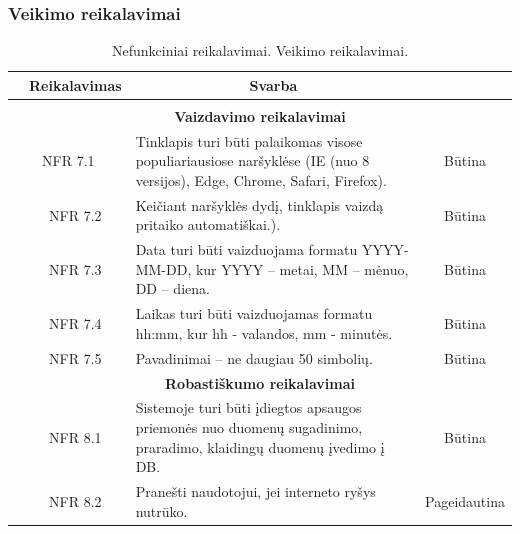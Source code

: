 \documentclass{VUMIFPSkursinis}
\begin{document}
\subsubsection{Veikimo reikalavimai}
\begin{table}[H]
	\caption{Nefunkciniai reikalavimai. Veikimo reikalavimai.}
	\begin{tabular}{|p{1cm}|p{1cm}|p{}|p{}|}
		\hline 
		\rowcolor{gray!50}
		\multicolumn{2}{|c|}{{\bfseries Kodas}}&
		\multicolumn{1}{c|}{{\bfseries Reikalavimas}}&
		\multicolumn{1}{c|}{{\bfseries Svarba}}\\
		\hline
		\rowcolor{lightgray}
		\multicolumn{4}{|c|}{Veikimo reikalavimai}\\		
		
		\hline
		\multicolumn{4}{|c|}{\bfseries Vaizdavimo reikalavimai}\\	
		
		\hline
		\multicolumn{2}{|c|}{NFR 7.1}&
		{Tinklapis turi būti palaikomas visose populiariausiose naršyklėse (IE (nuo 8 versijos), Edge, Chrome, Safari, Firefox).
		}&		
		\multicolumn{1}{c|}{Būtina}\\
		\hline
		\multicolumn{1}{|c}{}&
		\multicolumn{1}{c|}{NFR 7.2}&
		{Keičiant naršyklės dydį, tinklapis vaizdą pritaiko automatiškai.).
		}&		
		\multicolumn{1}{c|}{Būtina}\\
		
		\hline
		\multicolumn{1}{|c}{}&
		\multicolumn{1}{c|}{NFR 7.3}&
		{Data turi būti vaizduojama formatu YYYY-MM-DD, kur
			YYYY – metai, MM – mėnuo, DD – diena.
		}&		
		\multicolumn{1}{c|}{Būtina}\\
		
		\hline
		\multicolumn{1}{|c}{}&
		\multicolumn{1}{c|}{NFR 7.4}&
		{Laikas turi būti vaizduojamas formatu hh:mm, kur hh - valandos, mm - minutės.
		}&		
		\multicolumn{1}{c|}{Būtina}\\
		
		\hline
		\multicolumn{1}{|c}{}&
		\multicolumn{1}{c|}{NFR 7.5}&
		{Pavadinimai – ne daugiau 50 simbolių.
		}&		
		\multicolumn{1}{c|}{Būtina}\\
		
		\hline
		\multicolumn{4}{|c|}{\bfseries Robastiškumo reikalavimai}\\		
		
		\hline
		\multicolumn{1}{|c}{}&
		\multicolumn{1}{c|}{NFR 8.1}&
		{Sistemoje turi būti įdiegtos apsaugos priemonės nuo duomenų sugadinimo, praradimo, klaidingų duomenų įvedimo į DB.
		}&
		\multicolumn{1}{c|}{Būtina}\\	
		\hline		
		\multicolumn{1}{|c}{}&
		\multicolumn{1}{c|}{NFR 8.2}&
		{Pranešti naudotojui, jei interneto ryšys nutrūko.
		}&
		\multicolumn{1}{c|}{Pageidautina}\\		
		

\end{tabular}
\end{table}
\end{document}
